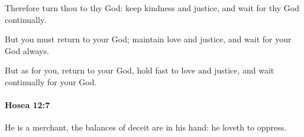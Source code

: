 			\begin{versebox}
					\item[BHS] 
					\item[LXX] 
					\item[ASV] Therefore turn thou to thy God: keep kindness and justice, and wait for thy God continually.
					\item[NIV] But you must return to your God; maintain love and justice, and wait for your God always.
					\item[NRSV] But as for you, return to your God, hold fast to love and justice, and wait continually for your God.
			\end{versebox}

		\paragraph{Hosea 12:7} %
			\label{HOSEA-12-7}

			He is a merchant, the balances of deceit are in his hand: he loveth to oppress.

